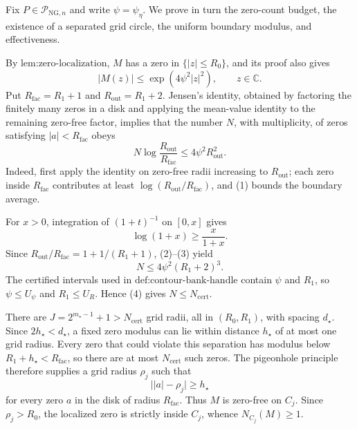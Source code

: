 Fix \(P\in\mathcal P_{\mathrm{NG},n}\) and write \(\psi=\psi_{\eta}\).  We prove in turn the zero-count budget, the existence of a separated grid circle, the uniform boundary modulus, and effectiveness.

By \(\text{lem:zero-localization}\), \(M\) has a zero in \(\{|z|\le R_0\}\), and its proof also gives
\[
 |M(z)|\le \exp(4\psi^2|z|^2),\qquad z\in\mathbb C. \tag{1}
\]
Put \(R_{\mathrm{fac}}=R_1+1\) and \(R_{\mathrm{out}}=R_1+2\).  Jensen's identity, obtained by factoring the finitely many zeros in a disk and applying the mean-value identity to the remaining zero-free factor, implies that the number \(N\), with multiplicity, of zeros satisfying \(|a|<R_{\mathrm{fac}}\) obeys
\[
 N\log\frac{R_{\mathrm{out}}}{R_{\mathrm{fac}}}
 \le4\psi^2R_{\mathrm{out}}^2. \tag{2}
\]
Indeed, first apply the identity on zero-free radii increasing to \(R_{\mathrm{out}}\); each zero inside \(R_{\mathrm{fac}}\) contributes at least \(\log(R_{\mathrm{out}}/R_{\mathrm{fac}})\), and (1) bounds the boundary average.

For \(x>0\), integration of \((1+t)^{-1}\) on \([0,x]\) gives
\[
 \log(1+x)\ge \frac{x}{1+x}. \tag{3}
\]
Since \(R_{\mathrm{out}}/R_{\mathrm{fac}}=1+1/(R_1+1)\), (2)--(3) yield
\[
 N\le4\psi^2(R_1+2)^3. \tag{4}
\]
The certified intervals used in \(\text{def:contour-bank-handle}\) contain \(\psi\) and \(R_1\), so \(\psi\le U_{\psi}\) and \(R_1\le U_R\).  Hence (4) gives \(N\le N_{\mathrm{cert}}\).

There are \(J=2^{m_{\star}-1}+1>N_{\mathrm{cert}}\) grid radii, all in \((R_0,R_1)\), with spacing \(d_{\star}\).  Since \(2h_{\star}<d_{\star}\), a fixed zero modulus can lie within distance \(h_{\star}\) of at most one grid radius.  Every zero that could violate this separation has modulus below \(R_1+h_{\star}<R_{\mathrm{fac}}\), so there are at most \(N_{\mathrm{cert}}\) such zeros.  The pigeonhole principle therefore supplies a grid radius \(\rho_j\) such that
\[
 \bigl||a|-\rho_j\bigr|\ge h_{\star} \tag{5}
\]
for every zero \(a\) in the disk of radius \(R_{\mathrm{fac}}\).  Thus \(M\) is zero-free on \(C_j\).  Since \(\rho_j>R_0\), the localized zero is strictly inside \(C_j\), whence \(N_{C_j}(M)\ge1\).

